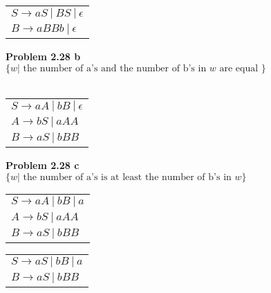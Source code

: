 \documentclass{article}
\newcommand{\problem}[1]{\large{\textbf{Problem #1} \\}}
\begin{document}
\begin{table}[h!]
\centering
\begin{tabular}{l}
$S \rightarrow a S\: | \:B S \:|\: \epsilon $\\
$B \rightarrow a BB b \: | \: \epsilon$\\
\end{tabular}
\end{table}

\problem{2.28 b}
$\{w| \text{ the number of a's and the number of b's in } w \text{ are equal }\}$ \\ \\

\begin{table}[h!]
\centering
\begin{tabular}{l}
$S \rightarrow a A\: | \:b B \:|\: \epsilon $\\
$A \rightarrow b S \:| \:a AA $ \\
$B \rightarrow a S \:| \:b BB $ \\
\end{tabular}
\end{table}
\problem{2.28 c}
$\{w| \text{ the number of a's is at least the number of b's in } w\}$

\begin{table}[h!]
\centering
\begin{tabular}{l}
$S \rightarrow a A\: | \:b B \:|\: a $\\
$A \rightarrow b S \:| \:a AA $ \\
$B \rightarrow a S \:| \:b BB $ \\
\end{tabular}
\end{table}

\begin{table}[h!]
\centering
\begin{tabular}{l}
$S \rightarrow a S\: | \:b B \:|\: a $\\
$B \rightarrow a S \:| \:b BB $ \\
\end{tabular}
\end{table}
\end{document}
